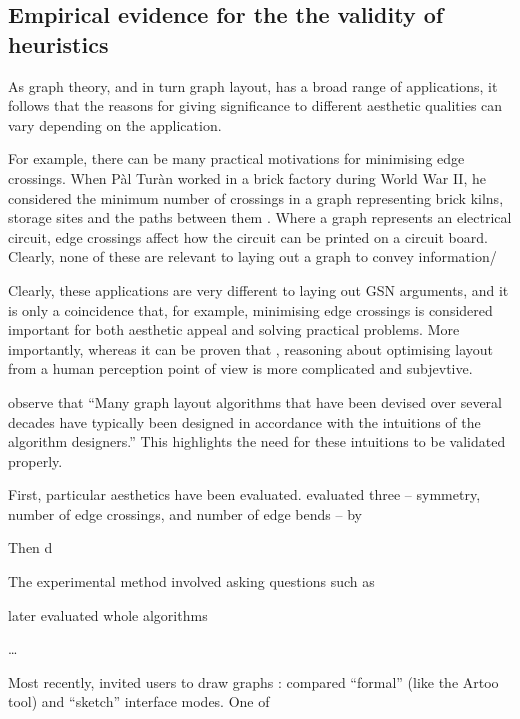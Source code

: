 \subsection{Empirical evidence for the the validity of heuristics}

As graph theory, and in turn graph layout, has a broad range of applications, it follows that the reasons for giving significance to different aesthetic qualities can vary depending on the application.

For example, there can be many practical motivations for minimising edge crossings.
When P\`{a}l Tur\`{a}n worked in a brick factory during World War II,
he considered the minimum number of crossings in a graph representing
brick kilns, storage sites and the paths between them .
Where a graph represents an electrical circuit, edge crossings affect how the circuit can be printed on a circuit board.
Clearly, none of these are relevant to laying out a graph to convey information/

Clearly, these applications are very different to laying out GSN arguments, and it is only a coincidence that, for example, minimising edge crossings is considered important for both aesthetic appeal and solving practical problems.
More importantly, whereas it can be proven that , reasoning about optimising layout from a human perception point of view is more complicated and subjevtive.

\citet{5674033} observe that ``Many graph layout algorithms that have been devised over
several decades have typically been designed in accordance with the intuitions of the algorithm designers.''
This highlights the need for these intuitions to be validated properly.

First, particular aesthetics have been evaluated. \citet{Purchase1997basis} evaluated three -- symmetry, number of edge crossings, and number of edge bends -- by 

Then \citet{Purchase1997which} d

The experimental method involved asking questions such as 

\citet{PURCHASE1998647} later evaluated whole algorithms

\ldots

Most recently, \citet{5674033} invited users to draw graphs :
compared ``formal'' (like the Artoo tool) and ``sketch'' interface modes.
One of



